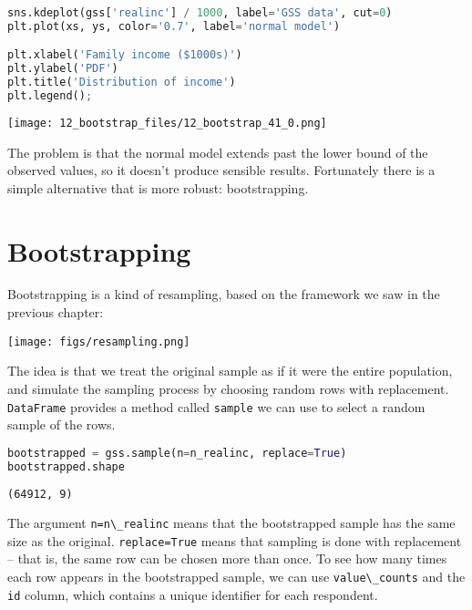 \begin{lstlisting}[language=Python,style=source]
sns.kdeplot(gss['realinc'] / 1000, label='GSS data', cut=0)
plt.plot(xs, ys, color='0.7', label='normal model')

plt.xlabel('Family income ($1000s)')
plt.ylabel('PDF')
plt.title('Distribution of income')
plt.legend();
\end{lstlisting}

\begin{center}
\texttt{[image: 12\_bootstrap\_files/12\_bootstrap\_41\_0.png]}
\end{center}

The problem is that the normal model extends past the lower bound of the
observed values, so it doesn't produce sensible results. Fortunately
there is a simple alternative that is more robust: bootstrapping.

\section{Bootstrapping}\label{bootstrapping}

Bootstrapping is a kind of resampling, based on the framework we saw in
the previous chapter:

\texttt{[image: figs/resampling.png]}

The idea is that we treat the original sample as if it were the entire
population, and simulate the sampling process by choosing random rows
with replacement. \passthrough{\lstinline!DataFrame!} provides a method
called \passthrough{\lstinline!sample!} we can use to select a random
sample of the rows.

\begin{lstlisting}[language=Python,style=source]
bootstrapped = gss.sample(n=n_realinc, replace=True)
bootstrapped.shape
\end{lstlisting}

\begin{lstlisting}[style=output]
(64912, 9)
\end{lstlisting}

The argument \passthrough{\lstinline!n=n\_realinc!} means that the
bootstrapped sample has the same size as the original.
\passthrough{\lstinline!replace=True!} means that sampling is done with
replacement -- that is, the same row can be chosen more than once. To
see how many times each row appears in the bootstrapped sample, we can
use \passthrough{\lstinline!value\_counts!} and the
\passthrough{\lstinline!id!} column, which contains a unique identifier
for each respondent.

